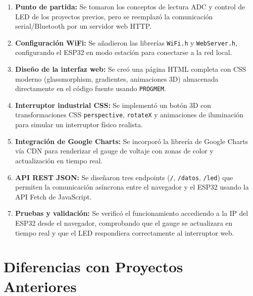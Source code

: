 \documentclass[12pt,a4paper]{article}
\begin{document}
\begin{enumerate}
    \item \textbf{Punto de partida:} Se tomaron los conceptos de lectura ADC y control de LED de los proyectos previos, pero se reemplazó la comunicación serial/Bluetooth por un servidor web HTTP.
    
    \item \textbf{Configuración WiFi:} Se añadieron las librerías \texttt{WiFi.h} y \texttt{WebServer.h}, configurando el ESP32 en modo estación para conectarse a la red local.
    
    \item \textbf{Diseño de la interfaz web:} Se creó una página HTML completa con CSS moderno (glassmorphism, gradientes, animaciones 3D) almacenada directamente en el código fuente usando \texttt{PROGMEM}.
    
    \item \textbf{Interruptor industrial CSS:} Se implementó un botón 3D con transformaciones CSS \texttt{perspective}, \texttt{rotateX} y animaciones de iluminación para simular un interruptor físico realista.
    
    \item \textbf{Integración de Google Charts:} Se incorporó la librería de Google Charts vía CDN para renderizar el gauge de voltaje con zonas de color y actualización en tiempo real.
    
    \item \textbf{API REST JSON:} Se diseñaron tres endpoints (\texttt{/}, \texttt{/datos}, \texttt{/led}) que permiten la comunicación asíncrona entre el navegador y el ESP32 usando la API Fetch de JavaScript.
    
    \item \textbf{Pruebas y validación:} Se verificó el funcionamiento accediendo a la IP del ESP32 desde el navegador, comprobando que el gauge se actualizara en tiempo real y que el LED respondiera correctamente al interruptor web.
\end{enumerate}

\section{Diferencias con Proyectos Anteriores}
\end{document}
